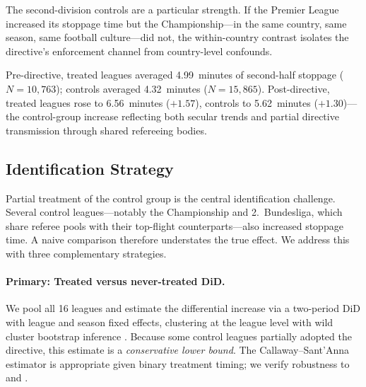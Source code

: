 

The second-division controls are a particular strength. If the Premier
League increased its stoppage time but the Championship---in the same
country, same season, same football culture---did not, the within-country
contrast isolates the directive's enforcement channel from country-level
confounds.

Pre-directive, treated leagues averaged 4.99~minutes of second-half
stoppage ($N = 10{,}763$); controls averaged 4.32~minutes ($N = 15{,}865$).
Post-directive, treated leagues rose to 6.56~minutes ($+1.57$), controls to
5.62~minutes ($+1.30$)---the control-group increase reflecting both secular
trends and partial directive transmission through shared refereeing bodies.

\subsection{Identification Strategy}
\label{subsec:identification}

Partial treatment of the control group is the central identification
challenge. Several control leagues---notably the Championship and
2.~Bundesliga, which share referee pools with their top-flight
counterparts---also increased stoppage time. A naive comparison therefore
understates the true effect. We address this with three complementary
strategies.

\paragraph{Primary: Treated versus never-treated DiD.}
We pool all 16 leagues and estimate the differential increase via a
two-period DiD with league and season fixed effects, clustering at the
league level with wild cluster bootstrap inference
\citep{cameron2008bootstrap}. Because some control leagues partially
adopted the directive, this estimate is a \textit{conservative lower
bound}. The Callaway--Sant'Anna estimator \citep{callaway2021difference}
is appropriate given binary treatment timing; we verify robustness to
\citet{sunAbraham2021} and \citet{borusyak2024revisiting}.


